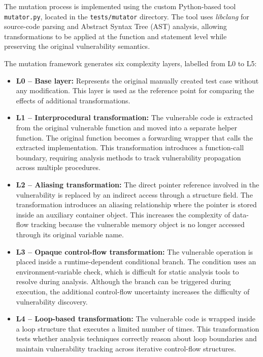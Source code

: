 \documentclass[11pt,a4paper]{article}
\begin{document}
The mutation process is implemented using the custom Python-based tool \texttt{mutator.py}, located in the \texttt{tests/mutator} directory. The tool uses \textit{libclang} for source-code parsing and Abstract Syntax Tree (AST) analysis, allowing transformations to be applied at the function and statement level while preserving the original vulnerability semantics.

The mutation framework generates six complexity layers, labelled from L0 to L5:

\begin{itemize}

    \item \textbf{L0 -- Base layer:}
    Represents the original manually created test case without any modification. This layer is used as the reference point for comparing the effects of additional transformations.

    \item \textbf{L1 -- Interprocedural transformation:}
    The vulnerable code is extracted from the original vulnerable function and moved into a separate helper function. The original function becomes a forwarding wrapper that calls the extracted implementation. This transformation introduces a function-call boundary, requiring analysis methods to track vulnerability propagation across multiple procedures.

    \item \textbf{L2 -- Aliasing transformation:}
    The direct pointer reference involved in the vulnerability is replaced by an indirect access through a structure field. The transformation introduces an aliasing relationship where the pointer is stored inside an auxiliary container object. This increases the complexity of data-flow tracking because the vulnerable memory object is no longer accessed through its original variable name.

    \item \textbf{L3 -- Opaque control-flow transformation:}
    The vulnerable operation is placed inside a runtime-dependent conditional branch. The condition uses an environment-variable check, which is difficult for static analysis tools to resolve during analysis. Although the branch can be triggered during execution, the additional control-flow uncertainty increases the difficulty of vulnerability discovery.

    \item \textbf{L4 -- Loop-based transformation:}
    The vulnerable code is wrapped inside a loop structure that executes a limited number of times. This transformation tests whether analysis techniques correctly reason about loop boundaries and maintain vulnerability tracking across iterative control-flow structures.


\end{itemize}
\end{document}
